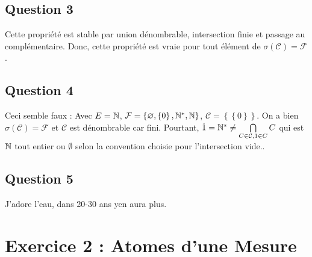 \documentclass{cours}
\begin{document}
        \subsection{Question 3}
            Cette propriété est stable par union dénombrable, intersection finie et passage au complémentaire. Donc, cette propriété est vraie pour tout élément de $\sigma\left(\mathcal{C}\right) = \mathcal{F}$.

         \subsection{Question 4}
            Ceci semble faux : Avec $E = \mathbb{N}$, $\mathcal{F} = \left\{\varnothing, \left\{0\right\}, \mathbb{N}^{*}, \mathbb{N} \right\}$, $\mathcal{C} = \left\{\left\{0\right\}\right\}$. On a bien $\sigma\left(\mathcal{C}\right) = \mathcal{F}$ et $\mathcal{C}$ est dénombrable car fini. 
            Pourtant, $\dot{1} = \mathbb{N}^{*} \neq \bigcap\limits_{C \in \mathcal{C}, 1 \in C} C$ qui est $\mathbb{N}$ tout entier ou $\emptyset$ selon la convention choisie pour l'intersection vide.. 

        \subsection{Question 5}
            J'adore l'eau, dans 20-30 ans yen aura plus. 
            


    \section{Exercice 2 : Atomes d'une Mesure}
\end{document}
